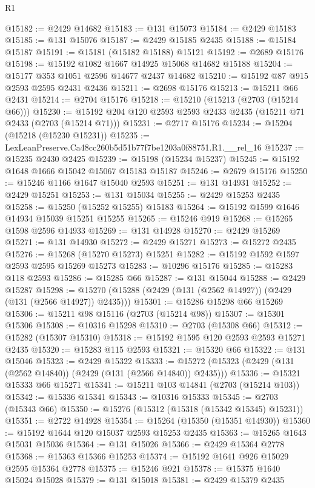 \begin{lexlean}{R1}
\begin{coremodule}
@15182 := @2429 @14682
@15183 := @131 @15073
@15184 := @2429 @15183
@15185 := @131 @15076
@15187 := @2429 @15185 @2435
@15188 := @15184 @15187
@15191 := @15181 (@15182 @15188) @15121
@15192 := @2689 @15176
@15198 := @15192 @1082 @1667 @14925 @15068 @14682 @15188
@15204 := @15177 @353 @1051 @2596 @14677 @2437 @14682
@15210 := @15192 @87 @915 @2593 @2595 @2431 @2436
@15211 := @2698 @15176
@15213 := @15211 @66 @2431
@15214 := @2704 @15176
@15218 := @15210 (@15213 (@2703 (@15214 @66)))
@15230 := @15192 @204 @120 @2593 @2593 @2433 @2435 (@15211 @71 @2433 (@2703 (@15214 @71)))
@15231 := @2717 @15176
@15234 := @15204 (@15218 (@15230 @15231))
@15235 := LexLeanPreserve.Ca48cc260b5d51b77f7be1203a0f88751.R1.__rel_16
@15237 := @15235 @2430 @2425
@15239 := @15198 (@15234 @15237)
@15245 := @15192 @1648 @1666 @15042 @15067 @15183 @15187
@15246 := @2679 @15176
@15250 := @15246 @1166 @1647 @15040 @2593
@15251 := @131 @14931
@15252 := @2429 @15251
@15253 := @131 @15034
@15255 := @2429 @15253 @2435
@15258 := @15250 (@15252 @15255) @15183
@15264 := @15192 @1599 @1646 @14934 @15039 @15251 @15255
@15265 := @15246 @919
@15268 := @15265 @1598 @2596 @14933
@15269 := @131 @14928
@15270 := @2429 @15269
@15271 := @131 @14930
@15272 := @2429 @15271
@15273 := @15272 @2435
@15276 := @15268 (@15270 @15273) @15251
@15282 := @15192 @1592 @1597 @2593 @2595 @15269 @15273
@15283 := @10296 @15176
@15285 := @15283 @118 @2593
@15286 := @15285 @66
@15287 := @131 @15044
@15288 := @2429 @15287
@15298 := @15270 (@15288 (@2429 (@131 (@2562 @14927)) (@2429 (@131 (@2566 @14927)) @2435)))
@15301 := @15286 @15298 @66 @15269
@15306 := @15211 @98 @15116 (@2703 (@15214 @98))
@15307 := @15301 @15306
@15308 := @10316 @15298
@15310 := @2703 (@15308 @66)
@15312 := @15282 (@15307 @15310)
@15318 := @15192 @1595 @120 @2593 @2593 @15271 @2435
@15320 := @15283 @115 @2593
@15321 := @15320 @66
@15322 := @131 @15046
@15323 := @2429 @15322
@15333 := @15272 (@15323 (@2429 (@131 (@2562 @14840)) (@2429 (@131 (@2566 @14840)) @2435)))
@15336 := @15321 @15333 @66 @15271
@15341 := @15211 @103 @14841 (@2703 (@15214 @103))
@15342 := @15336 @15341
@15343 := @10316 @15333
@15345 := @2703 (@15343 @66)
@15350 := @15276 (@15312 (@15318 (@15342 @15345) @15231))
@15351 := @2722 @14928
@15354 := @15264 (@15350 (@15351 @14930))
@15360 := @15192 @1644 @120 @15037 @2593 @15253 @2435
@15363 := @15265 @1643 @15031 @15036
@15364 := @131 @15026
@15366 := @2429 @15364 @2778
@15368 := @15363 @15366 @15253
@15374 := @15192 @1641 @926 @15029 @2595 @15364 @2778
@15375 := @15246 @921
@15378 := @15375 @1640 @15024 @15028
@15379 := @131 @15018
@15381 := @2429 @15379 @2435

\end{coremodule}
\end{lexlean}
